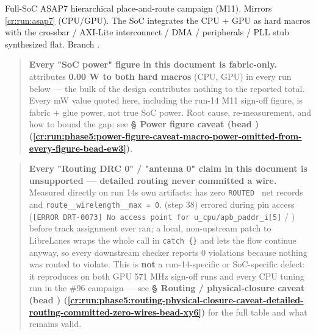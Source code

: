 \begin{record}

Full-SoC ASAP7 hierarchical place-and-route campaign (M11). Mirrors
\cref{cr:run:asap7} (CPU/\allowbreak{}GPU). The SoC
integrates the CPU + GPU as hard macros with the crossbar / AXI-Lite
interconnect / DMA / peripherals / PLL stub synthesized flat. Branch
.

\begin{quote}
\warn{} \textbf{Every "SoC power" figure in this document is
fabric-only.}  attributes \textbf{0.00 W to both hard
macros} (CPU, GPU) in every run below --- the bulk of the design
contributes nothing to the reported total. Every mW value quoted here,
including the run-14 M11 sign-off figure, is fabric + glue power, not
true SoC power. Root cause, re-measurement, and how to bound the gap:
see \textbf{§ Power figure caveat (bead
) (\cref{cr:run:phase5:power-figure-caveat-macro-power-omitted-from-every-figure-bead-ew3})}.
\end{quote}

\begin{quote}
\warn{} \textbf{Every "Routing DRC 0" / "antenna 0" claim in this
document is unsupported --- detailed routing never committed a wire.}
Measured directly on run 14\textquotesingle s own artifacts:
 has zero \texttt{ROUTED\ } net records and
\texttt{route\_\allowbreak{}\_\allowbreak{}wirelength\_\allowbreak{}\_\allowbreak{}max\ =\allowbreak{}\ 0}.
 (step 38) errored during pin access
(\texttt{[ERROR\ DRT-\allowbreak{}0073]\ No\ access\ point\ for\ u\_\allowbreak{}cpu/\allowbreak{}apb\_\allowbreak{}paddr\_\allowbreak{}i[5]}
/ ) before track assignment ever ran; a
local, non-upstream patch to LibreLane\textquotesingle s 
wraps the whole call in \texttt{catch\ \{\}} and lets the flow continue
anyway, so every downstream checker reports 0 violations because nothing
was routed to violate. This is \textbf{not} a run-14-specific or
SoC-specific defect: it reproduces on both GPU 571 MHz sign-off runs and
every CPU tuning run in the \#96 campaign --- see \textbf{§ Routing /
physical-closure caveat (bead
) (\cref{cr:run:phase5:routing-physical-closure-caveat-detailed-routing-committed-zero-wires-bead-xy6})}
for the full table and what remains valid.
\end{quote}


\end{record}
